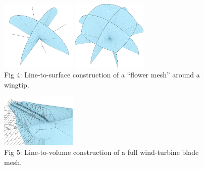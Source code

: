 \documentclass[landscape]{sintefposter}
\begin{document}
\begin{multicols}{3}
\begin{figure}[ht]
\begin{center}
    \includegraphics[width=0.32\textwidth]{Figures/wingtip-centers}
    \includegraphics[width=0.32\textwidth]{Figures/wingtip-flower} \\
    \small{
      Fig 4: Line-to-surface construction of a ``flower mesh'' around a wingtip.
    }
  \end{center}
\end{figure}
\begin{figure}[ht]
  \begin{center}
    \includegraphics[width=0.32\textwidth]{Figures/block-2} \\
    \small{
      Fig 5: Line-to-volume construction of a full wind-turbine blade mesh.
    }
  \end{center}
\end{figure}


\end{multicols}
\end{document}

